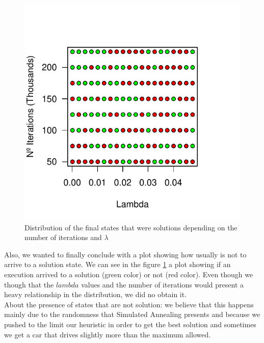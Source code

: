\documentclass[12]{article}
\begin{document}
    
    \begin{figure}[H]
    \captionsetup{justification=centering}
     \centering
      \includegraphics[scale=0.45]{Results/data_B_4.pdf}
        \caption{Distribution of the final states that were solutions depending on the number of iterations and $\lambda$}
        \label{fig:data5}
    \end{figure}
      \vspace{1cm}
Also, we wanted to finally conclude with a plot showing how usually is not to arrive to a solution state. We can see in the figure \ref{fig:data5} a plot showing if an execution arrived to a solution (green color) or not (red color). Even though we though that the $lambda$ values and the number of iterations would present a heavy relationship in the distribution, we did no obtain it. 
 \\
 \medskip
About the presence of states that are not solution: we believe that this happens mainly due to the randomness that Simulated Annealing presents and because we pushed to the limit our heuristic in order to get the best solution and sometimes we get a car that drives slightly more than the maximum allowed. 
\end{document}
